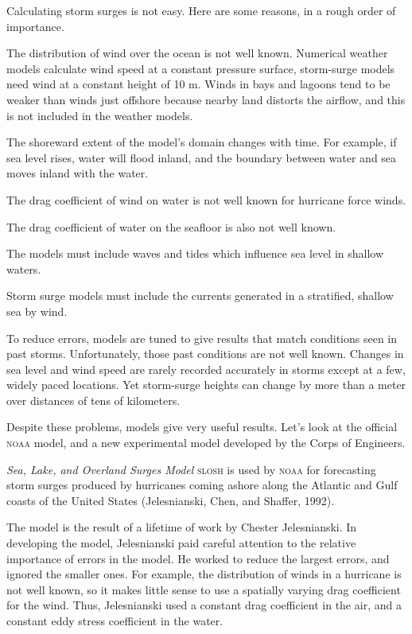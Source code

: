 Calculating storm surges is not easy. Here are some reasons, in a
rough order of importance.
\begin{enumerate}
\vitem The distribution of wind over the ocean is not well
known. Numerical weather models calculate wind speed at a constant
pressure surface, storm-surge models need wind at a constant height of
10 m. Winds in bays and lagoons tend to be weaker than winds just
offshore because nearby land distorts the airflow, and this is not
included in the weather models.

\vitem The shoreward extent of the model's domain changes with
time. For example, if sea level rises, water will flood inland, and
the boundary between water and sea moves inland with the water.

\vitem The drag coefficient of wind on water
is not well known for hurricane force winds.

\vitem The drag coefficient of water on the
seafloor is also not well known.

\vitem The models must include waves and tides which influence sea
level in shallow waters.

\vitem Storm surge models must include the currents generated in a
stratified, shallow sea by wind.
\end{enumerate}
To reduce errors, models are tuned to give results that match
conditions seen in past storms. Unfortunately, those past conditions
are not well known. Changes in sea level and wind speed are rarely
recorded accurately in storms except at a few, widely paced
locations. Yet storm-surge heights can change by more than a meter
over distances of tens of kilometers.

Despite these problems, models give very useful results. Let's look at
the official \textsc{noaa} model, and a new experimental model
developed by the Corps of Engineers.

\textit{Sea, Lake, and Overland Surges Model} \textsc{slosh} is used
by \textsc{noaa} for forecasting storm surges produced
by hurricanes coming ashore along the Atlantic and Gulf coasts of the
United States (Jelesnianski, Chen, and Shaffer, 1992).

The model is the result of a lifetime of work by Chester
Jelesnianski. In developing the model, Jelesnianski paid careful
attention to the relative importance of errors in the model. He worked
to reduce the largest errors, and ignored the smaller ones. For
example, the distribution of winds in a hurricane is not well known,
so it makes little sense to use a spatially varying drag
coefficient for the wind. Thus, Jelesnianski
used a constant drag coefficient in the air,
and a constant eddy stress coefficient in the water.

